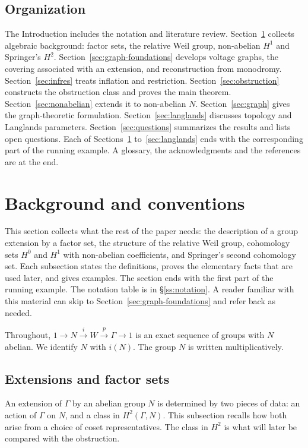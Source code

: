 \documentclass[12pt,letterpaper]{article}
\numberwithin{equation}{section}
\theoremstyle{plain}
\theoremstyle{definition}
\begin{document}
\subsection{Organization}

The Introduction includes the notation and literature review.
Section~\ref{sec:background} collects algebraic background: factor sets,
the relative Weil group, non-abelian $H^1$ and Springer's $H^2$.
Section~\ref{sec:graph-foundations} develops voltage graphs, the covering associated with an extension, and reconstruction from monodromy. Section~\ref{sec:infres} treats inflation and restriction.
Section~\ref{sec:obstruction} constructs the obstruction class and proves
the main theorem. Section~\ref{sec:nonabelian} extends it to non-abelian
$N$. Section~\ref{sec:graph} gives the graph-theoretic formulation.
Section~\ref{sec:langlands} discusses topology and Langlands parameters.
Section~\ref{sec:questions} summarizes the results and lists open
questions. Each of Sections~\ref{sec:background} to~\ref{sec:langlands}
ends with the corresponding part of the running example. A glossary, the
acknowledgments and the references are at the end.

\section{Background and conventions}\label{sec:background}

This section collects what the rest of the paper needs: the description
of a group extension by a factor set, the structure of the relative Weil
group, cohomology sets $H^0$ and $H^1$ with non-abelian coefficients, and
Springer's second cohomology set. Each subsection states the definitions,
proves the elementary facts that are used later, and gives examples. The
section ends with the first part of the running example. The notation table is in \S\ref{ss:notation}. A reader familiar with this material can skip to
Section~\ref{sec:graph-foundations} and refer back as needed.

Throughout, $1\to N\overset{i}{\to}W\overset{p}{\to}\Gamma\to1$ is an exact
sequence of groups with $N$ abelian. We identify $N$ with $i(N)$. The group
$N$ is written multiplicatively.

\subsection{Extensions and factor sets}

An extension of $\Gamma$ by an abelian group $N$ is determined by two
pieces of data: an action of $\Gamma$ on $N$, and a class in
$H^2(\Gamma,N)$. This subsection recalls how both arise from a choice of
coset representatives. The class in $H^2$ is what will later be compared
with the obstruction.
\end{document}

